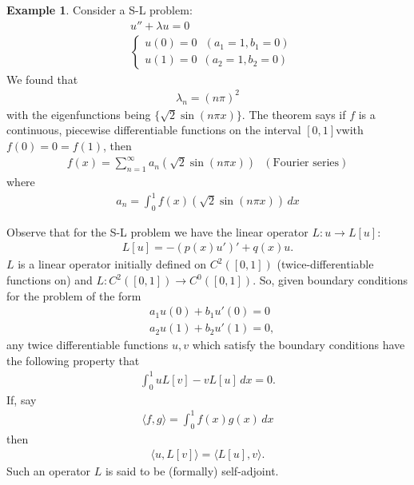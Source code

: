 \documentclass{article}
\theoremstyle{definition}
\newtheorem{exmp}{Example}[section]
\begin{document}
\begin{exmp}
	Consider a S-L problem:
	\begin{align*}
	&u'' + \lambda u = 0\\
	&\begin{cases}
	u(0)=0\,\,\,\, (a_1=1,b_1=0)\\
	u(1) = 0\,\,\, (a_2=1, b_2=0)
	\end{cases}
	\end{align*}
	We found that
	\begin{align*}
	\lambda_n = (n\pi)^2
	\end{align*}
	with the eigenfunctions being $\{\sqrt{2} \sin(n\pi x) \}$. The theorem says if $f$ is a continuous, piecewise differentiable functions on the interval $[0,1]$vwith $f(0) = 0 = f(1)$, then 
	\begin{align*}
	f(x) = \sum^\infty_{n=1}a_n\left(\sqrt{2}\sin(n\pi x)\right)\,\,\,\, (\text{Fourier series})
	\end{align*}
	where 
	\begin{align*}
	a_n = \int^1_0 f(x)\left(\sqrt{2}\sin(n\pi x) \right)\,dx
	\end{align*}
\end{exmp}

Observe that for the S-L problem we have the linear operator $L : u \to L[u]$:
\begin{align*}
L[u] = -(p(x)u')' + q(x)u.
\end{align*}
$L$ is a linear operator initially defined on $C^2([0,1])$ (twice-differentiable functions on) and $L : C^2([0,1])\to C^0([0,1])$. So, given boundary conditions for the problem of the form 
\begin{align*}
&a_1u(0) + b_1u'(0) = 0\\
&a_2u(1) + b_2u'(1) = 0,
\end{align*}
any twice differentiable functions $u,v$ which satisfy the boundary conditions have the following property that 
\begin{align*}
\int^1_0 uL[v] - vL[u]\,dx = 0.
\end{align*}
If, say
\begin{align*}
\langle f,g \rangle = \int^1_0 f(x)g(x)\,dx
\end{align*}
then 
\begin{align*}
\langle u,L[v]\rangle = \langle L[u],v\rangle.
\end{align*}
Such an operator $L$ is said to be (formally) self-adjoint. 
\end{document}
